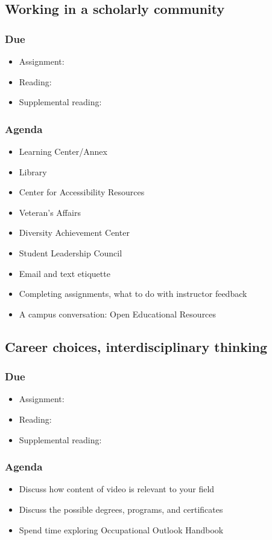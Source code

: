 \documentclass[12pt,article,oneside]{memoir}
\begin{document}
\subsection{Working in a scholarly community}
\subsubsection{Due}
\begin{itemize}
 \item Assignment: 
 \item Reading: \cite{oer}
 \item Supplemental reading: \cite{oer-dh}
\end{itemize}


\subsubsection{Agenda}
\begin{itemize}
 \item Learning Center/Annex
 \item Library
 \item Center for Accessibility Resources
 \item Veteran's Affairs
 \item Diversity Achievement Center
 \item Student Leadership Council
 \item Email and text etiquette
 \item Completing assignments, what to do with instructor feedback
 \item A campus conversation: Open Educational Resources
\end{itemize}



\subsection{Career choices, interdisciplinary thinking}
\subsubsection{Due}
\begin{itemize}
 \item Assignment: 
 \item Reading: \cite{worksheets,ooh}
 \item Supplemental reading: \cite{gen-ed}
\end{itemize}


\subsubsection{Agenda}
\begin{itemize}
 \item Discuss how content of video is relevant to your field
 \item Discuss the possible degrees, programs, and certificates
 \item Spend time exploring Occupational Outlook Handbook
\end{itemize}
\end{document}
